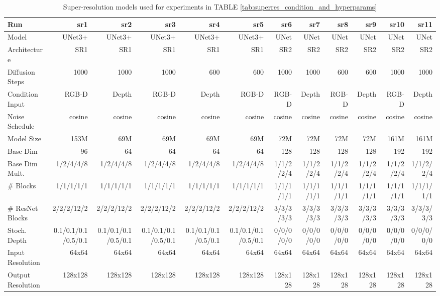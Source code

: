 \begin{table}[t]
\tiny
\centering
\caption{Super-resolution models used for experiments in TABLE \ref{tab:superres_condition_and_hyperparams}}
\label{tab:experiment_model_description_superres_condition}
\begin{tabular}{ l || r r r r r | r r r r r r }
\textbf{Run} & \textbf{sr1} & \textbf{sr2} & \textbf{sr3} & \textbf{sr4} & \textbf{sr5} & \textbf{sr6} & \textbf{sr7} & \textbf{sr8} & \textbf{sr9} & \textbf{sr10} & \textbf{sr11} \\ 
\hline
\hline
 Model & UNet3+ & UNet3+ & UNet3+ & UNet3+ & UNet3+ & UNet & UNet & UNet & UNet & UNet & UNet\\
 Architecture & SR1 & SR1 & SR1 & SR1 & SR1 & SR2 & SR2 & SR2 & SR2 & SR2 & SR2\\
 Diffusion Steps & 1000 & 1000 & 1000 & 600 & 600 & 1000 & 1000 & 600 & 600 & 1000 & 1000 \\
 Condition Input & RGB-D & Depth & RGB-D & Depth & RGB-D & RGB-D & Depth & RGB-D & Depth & RGB-D & Depth \\
 Noise Schedule & cosine & cosine & cosine & cosine & cosine & cosine & cosine & cosine & cosine & cosine & cosine \\
 Model Size & 153M & 69M & 69M & 69M & 69M & 72M & 72M & 72M & 72M & 161M & 161M \\
 Base Dim & 96 & 64 & 64 & 64 & 64 & 128 & 128 & 128 & 128 & 192 & 192 \\
 Base Dim Mult. & 1/2/4/4/8 & 1/2/4/4/8 & 1/2/4/4/8 & 1/2/4/4/8 & 1/2/4/4/8 & 1/1/2/2/4 & 1/1/2/2/4 & 1/1/2/2/4 & 1/1/2/2/4 & 1/1/2/2/4 & 1/1/2/2/4 \\
 \# Blocks & 1/1/1/1/1 & 1/1/1/1/1 & 1/1/1/1/1 & 1/1/1/1/1 & 1/1/1/1/1 & 1/1/1/1/1 & 1/1/1/1/1 & 1/1/1/1/1 & 1/1/1/1/1 & 1/1/1/1/1 & 1/1/1/1/1 \\
 \# ResNet Blocks & 2/2/2/12/2 & 2/2/2/12/2 & 2/2/2/12/2 & 2/2/2/12/2 & 2/2/2/12/2 & 3/3/3/3/3 & 3/3/3/3/3 & 3/3/3/3/3 & 3/3/3/3/3 & 3/3/3/3/3 & 3/3/3/3/3 \\
 Stoch. Depth & 0.1/0.1/0.1/0.5/0.1 & 0.1/0.1/0.1/0.5/0.1 & 0.1/0.1/0.1/0.5/0.1 & 0.1/0.1/0.1/0.5/0.1 & 0.1/0.1/0.1/0.5/0.1 & 0/0/0/0/0 & 0/0/0/0/0 & 0/0/0/0/0 & 0/0/0/0/0 & 0/0/0/0/0 & 0/0/0/0/0 \\
 Input Resolution & 64x64 & 64x64 & 64x64 & 64x64 & 64x64 & 64x64 & 64x64 & 64x64 & 64x64 & 64x64 & 64x64 \\
 Output Resolution & 128x128 & 128x128 & 128x128 & 128x128 & 128x128 & 128x128 & 128x128 & 128x128 & 128x128 & 128x128 & 128x128 \\

\end{tabular}
\end{table}
